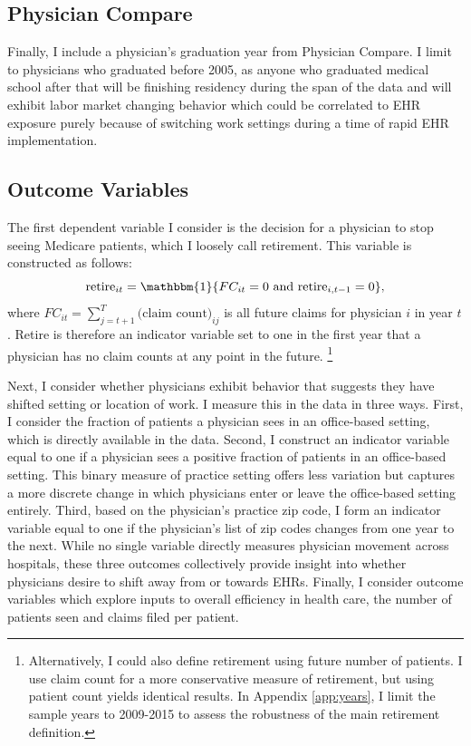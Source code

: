 \documentclass[12pt]{article}
\begin{document}
\subsection{Physician Compare}

Finally, I include a physician's graduation year from Physician Compare. I limit to physicians who graduated before 2005, as anyone who graduated medical school after that will be finishing residency during the span of the data and will exhibit labor market changing behavior which could be correlated to EHR exposure purely because of switching work settings during a time of rapid EHR implementation.

\subsection{Outcome Variables}\label{sec:outcome}

The first dependent variable I consider is the decision for a physician to stop seeing Medicare patients, which I loosely call retirement. This variable is constructed as follows: 
$$\text{retire}_{it}=\mathbbm{1}\{FC_{it}=0 \text{ and retire}_{i,t-1}=0\}, $$
where $FC_{it}=\sum\limits_{j=t+1}^T\text{(claim count)}_{ij}$ is all future claims for physician $i$ in year $t$. Retire is therefore an indicator variable set to one in the first year that a physician has no claim counts at any point in the future. \footnote{Alternatively, I could also define retirement using future number of patients. I use claim count for a more conservative measure of retirement, but using patient count yields identical results. In Appendix \ref{app:years}, I limit the sample years to 2009-2015 to assess the robustness of the main retirement definition.}

Next, I consider whether physicians exhibit behavior that suggests they have shifted setting or location of work. I measure this in the data in three ways. First, I consider the fraction of patients a physician sees in an office-based setting, which is directly available in the data. Second, I construct an indicator variable equal to one if a physician sees a positive fraction of patients in an office-based setting. This binary measure of practice setting offers less variation but captures a more discrete change in which physicians enter or leave the office-based setting entirely. Third, based on the physician's practice zip code, I form an indicator variable equal to one if the physician's list of zip codes changes from one year to the next. While no single variable directly measures physician movement across hospitals, these three outcomes collectively provide insight into whether physicians desire to shift away from or towards EHRs. Finally, I consider outcome variables which explore inputs to overall efficiency in health care, the number of patients seen and claims filed per patient.
\end{document}
